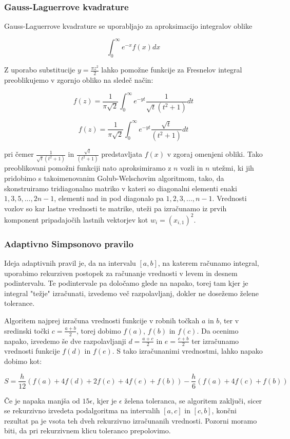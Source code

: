\documentclass[12pt,a4paper]{article}
\begin{document}
\subsubsection{Gauss-Laguerrove kvadrature}

Gauss-Laguerrove kvadrature se uporabljajo za aproksimacijo integralov oblike


\[
\int_0^{\infty}e^{-x}f(x)dx
\]

Z uporabo substitucije $y=\frac{\pi z^2}{2}$ lahko pomožne funkcije za Fresnelov integral preoblikujemo v zgornjo obliko na sledeč način:


\[
f(z)=\frac{1}{\pi\sqrt{2}}\int_0^{\infty}e^{-yt}\frac{1}{\sqrt{t}(t^2+1)}dt
\]

\[
f(z)=\frac{1}{\pi\sqrt{2}}\int_0^{\infty}e^{-yt}\frac{\sqrt{t}}{(t^2+1)}dt
\]

pri čemer $\frac{1}{\sqrt{t}(t^2+1)}$ in $\frac{\sqrt{t}}{(t^2+1)}$ predstavljata $f(x)$ v zgoraj omenjeni obliki. Tako preoblikovani pomožni funkciji nato aproksimiramo z $n$ vozli in $n$ utežmi, ki jih pridobimo  s takoimenovanim Golub-Welschovim algoritmom, tako, da skonstruiramo tridiagonalno matriko v kateri so diagonalni elementi enaki $1,3,5,...,2n-1$, elementi nad in pod diagonalo pa $1,2,3,...,n-1$. Vrednosti vozlov so kar lastne vrednosti te matrike, uteži pa izračunamo iz prvih komponent pripadajočih lastnih vektorjev kot $w_i=(x_{i,1})^2$.


\subsubsection{Adaptivno Simpsonovo pravilo}

Ideja adaptivnih pravil je, da na intervalu $[a,b]$, na katerem računamo integral, uporabimo rekurziven postopek za računanje vrednosti v levem in desnem podintervalu. Te podintervale pa določamo glede na napako, torej tam kjer je integral "težje" izračunati, izvedemo več razpolavljanj, dokler ne dosežemo želene tolerance.


Algoritem najprej izračuna vrednosti funkcije v robnih točkah $a$ in $b$, ter v sredinski točki $c=\frac{a+b}{2}$, torej dobimo $f(a)$, $f(b)$ in $f(c)$. Da ocenimo napako, izvedemo še dve razpolavljanji $d=\frac{a+c}{2}$  in $e=\frac{c+b}{2}$ ter izračunamo vrednosti funkcije $f(d)$ in $f(e)$. S tako izračunanimi vrednostmi, lahko napako dobimo kot:


\[
S=\frac{h}{12}(f(a)+4f(d)+2f(c)+4f(e)+f(b))-\frac{h}{6}(f(a)+4f(c)+f(b))
\]

Če je napaka manjša od $15\epsilon$, kjer je $\epsilon$ želena toleranca, se algoritem zaključi, sicer se rekurzivno izvedeta podalgoritma na intervalih $[a,c]$ in $[c,b]$, končni rezultat pa je vsota teh dveh rekurzivno izračunanih vrednosti. Pozorni moramo biti, da pri rekurzivnem klicu toleranco prepolovimo.
\end{document}
